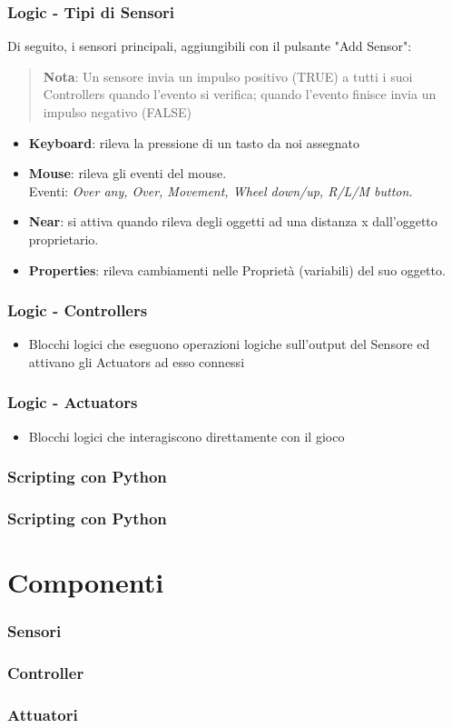 \documentclass{beamer}
\begin{document}
		\begin{frame}
			\frametitle{Logic - Tipi di Sensori}
			Di seguito, i sensori principali, aggiungibili con il pulsante "Add Sensor":
			\begin{quote}
			\textcolor{BlenderOrange}{\textbf{Nota}: Un sensore invia un impulso positivo (TRUE) a tutti i suoi Controllers quando l'evento si verifica; quando l'evento finisce invia un impulso negativo (FALSE)}
			\end{quote}
			\begin{itemize}
				\item \textbf{Keyboard}: rileva la pressione di un tasto da noi assegnato %
				\item \textbf{Mouse}: rileva gli eventi del mouse. \\ {\footnotesize\hspace{1em}Eventi: \textit{Over any, Over, Movement, Wheel down/up, R/L/M button.}}
				\item \textbf{Near}: si attiva quando rileva degli oggetti ad una distanza x dall'oggetto proprietario.
				\item \textbf{Properties}: rileva cambiamenti nelle Proprietà (variabili) del suo oggetto.
			\end{itemize}
		\end{frame}	
		
		\begin{frame}
			\frametitle{Logic - Controllers} %
			\begin{itemize}
				\item Blocchi logici che eseguono operazioni logiche sull'output del Sensore ed attivano gli Actuators ad esso connessi
			\end{itemize}
		\end{frame}	
		\begin{frame}
			\frametitle{Logic - Actuators} %
			\begin{itemize}
				\item Blocchi logici che interagiscono direttamente con il gioco
			\end{itemize}
		\end{frame}			
		
		\begin{frame}
			\frametitle{Scripting con Python}
		\end{frame}	
		
		\begin{frame}
			\frametitle{Scripting con Python}
		\end{frame}	
	
	\section{Componenti}
		\begin{frame}
			\frametitle{Sensori}
		\end{frame}
		\begin{frame}
			\frametitle{Controller}
		\end{frame}
		\begin{frame}
			\frametitle{Attuatori}
		\end{frame}
\end{document}
